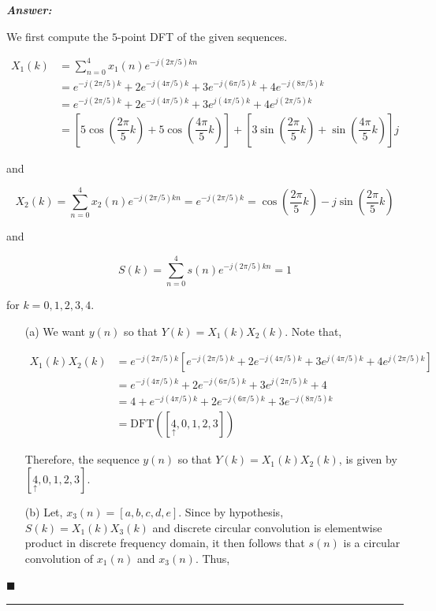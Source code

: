 \documentclass[12pt]{article}
\theoremstyle{definition}
\newenvironment{answer}{
    \textbf{\textit{Answer:}} \qquad
}{\hfill $\blacksquare$ \\ \begin{center}
    \rule{0.6\linewidth}{0.5px}    
\end{center}
}
\begin{document}
\begin{answer}
    We first compute the $5$-point DFT of the given sequences.

    \begin{align*}
        X_1(k) 
        & = \sum_{n = 0}^4 x_1(n) e^{-j(2\pi/5)k n}\\
        & = e^{-j(2\pi/5)k} + 2 e^{-j(4\pi/5)k} + 3e^{-j(6\pi/5)k} + 4e^{-j(8\pi/5)k}\\
        & = e^{-j(2\pi/5)k} + 2 e^{-j(4\pi/5)k} + 3e^{j(4\pi/5)k} + 4e^{j(2\pi/5)k}\\
        & = \left[ 5 \cos\left( \dfrac{2\pi}{5}k \right) + 5 \cos\left( \dfrac{4\pi}{5}k \right)\right] + \left[ 3 \sin\left( \dfrac{2\pi}{5}k \right) + \sin\left( \dfrac{4\pi}{5}k \right) \right] j
    \end{align*}

    and 

    $$
    X_2(k) = \sum_{n = 0}^4 x_2(n) e^{-j(2\pi/5)k n} = e^{-j(2\pi/5)k} = \cos\left( \dfrac{2\pi}{5}k \right) - j \sin\left( \dfrac{2\pi}{5}k \right)
    $$

    and 

    $$
    S(k) = \sum_{n = 0}^4 s(n) e^{-j(2\pi/5)k n} = 1
    $$

    for $k = 0, 1, 2, 3, 4$.

    \begin{enumerate}
        \item[(a)] We want $y(n)$ so that $Y(k) = X_1(k)X_2(k)$. Note that,
        
        \begin{align*}
            X_1(k) X_2(k)
            & = e^{-j(2\pi/5)k} \left[ e^{-j(2\pi/5)k} + 2 e^{-j(4\pi/5)k} + 3e^{j(4\pi/5)k} + 4e^{j(2\pi/5)k} \right]\\
            & = e^{-j(4\pi/5)k} + 2e^{-j(6\pi/5)k} + 3 e^{j(2\pi/5)k} + 4 \\
            & = 4 + e^{-j(4\pi/5)k} + 2e^{-j(6\pi/5)k} + 3 e^{-j(8\pi/5)k}\\
            & = \text{DFT}\left( [\underset{\uparrow}{4}, 0, 1, 2, 3] \right)
        \end{align*}

        Therefore, the sequence $y(n)$ so that $Y(k) = X_1(k)X_2(k)$, is given by $[\underset{\uparrow}{4}, 0, 1, 2, 3]$.

        \item[(b)] Let, $x_3(n) = [a, b, c, d, e]$. Since by hypothesis, $S(k) = X_1(k)X_3(k)$ and discrete circular convolution is elementwise product in discrete frequency domain, it then follows that $s(n)$ is a circular convolution of $x_1(n)$ and $x_3(n)$. Thus,
        

\end{enumerate}
\end{answer}
\end{document}
